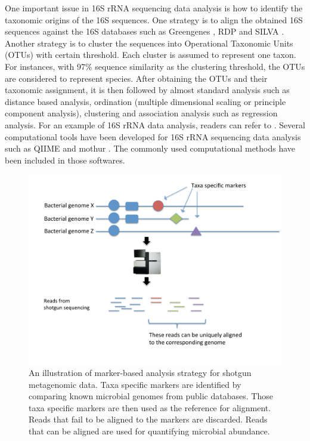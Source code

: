 One important issue in 16S rRNA sequencing data analysis is how to identify the taxonomic origins of the 16S sequences. One strategy  is to align the obtained 16S sequences against the 16S databases such as Greengenes \citep{DeSantis:2006ii}, RDP \citep{Cole:2014jw} and SILVA \citep{Quast:2013hk}. Another strategy is to cluster the sequences into Operational Taxonomic Units (OTUs) with certain threshold. Each cluster is assumed to represent one taxon. For instances, with 97\% sequence similarity as the clustering threshold, the OTUs are considered to represent species.  After obtaining the OTUs and their taxonomic assignment, it is then followed by almost standard analysis such as distance based analysis, ordination (multiple dimensional scaling or principle component analysis), clustering and association analysis such as regression analysis. For an example of 16S rRNA data analysis, readers can refer to \citet{wu2011linking}. Several computational tools have been developed for 16S rRNA sequencing data analysis such as QIIME \citep{Caporaso:2010jf} and mothur \citep{Schloss:2009do}. The commonly used computational methods have been included in those softwares.



\begin{figure}[p]
	\begin{center}
		\includegraphics[scale=0.55,trim=0 0 0 0,clip]{Figure/F11_MetaPhlAn.pdf}
		\caption[An illustration of marker-based analysis strategy  for shotgun metagenomic data]{An illustration of marker-based analysis strategy  for shotgun metagenomic data. Taxa specific markers are identified by comparing known microbial genomes from public databases. Those taxa specific markers are then used as the reference for alignment. Reads that fail to be aligned to the markers are discarded. Reads that can be aligned are used for quantifying microbial abundance.} \label{F11_MetaPhlAn}
	\end{center}
\end{figure}


